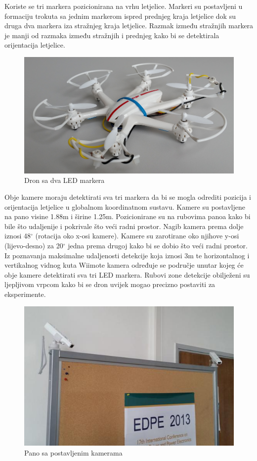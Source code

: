\documentclass[times, utf8, diplomski]{fer}
\begin{document}
Koriste se tri markera pozicionirana na vrhu letjelice. Markeri su postavljeni u formaciju trokuta sa jednim markerom ispred prednjeg kraja letjelice dok su druga dva markera iza stražnjeg kraja letjelice. Razmak između stražnjih markera je manji od razmaka između stražnjih i prednjeg kako bi se detektirala orijentacija letjelice.

\begin{figure}[h]
\centering
\includegraphics[width=.7\textwidth]{2led_side}
\caption{Dron sa dva LED markera}
\label{fig:2led_side}
\end{figure} 

Obje kamere moraju detektirati sva tri markera da bi se mogla odrediti pozicija i orijentacija letjelice u globalnom koordinatnom sustavu. Kamere su postavljene na pano visine 1.88m i širine 1.25m. Pozicionirane su na rubovima panoa kako bi bile što udaljenije i pokrivale što veći radni prostor. Nagib kamera prema dolje iznosi 48$^{\circ}$ (rotacija oko x-osi kamere). Kamere su zarotirane oko njihove y-osi (lijevo-desno) za 20$^{\circ}$ jedna prema drugoj kako bi se dobio što veći radni prostor. Iz poznavanja maksimalne udaljenosti detekcije koja iznosi 3m te horizontalnog i vertikalnog vidnog kuta Wiimote kamera određuje se područje unutar kojeg će obje kamere detektirati sva tri LED markera. Rubovi zone detekcije obilježeni su ljepljivom vrpcom kako bi se dron uvijek mogao precizno postaviti za eksperimente.

\begin{figure}[h]
\centering
\includegraphics[width=.7\textwidth]{kamere}
\caption{Pano sa postavljenim kamerama}
\label{fig:kamere_pano}
\end{figure} 
\end{document}
